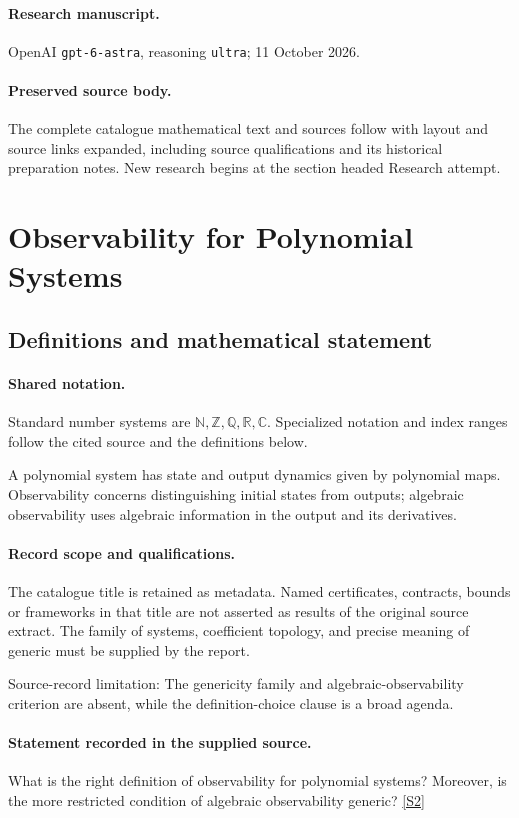 \documentclass[11pt]{article}
\begin{document}
\paragraph{Research manuscript.} OpenAI \texttt{gpt-6-astra}, reasoning \texttt{ultra}; 11 October 2026.
\paragraph{Preserved source body.} The complete catalogue mathematical text and sources follow with layout and source links expanded, including source qualifications and its historical preparation notes. New research begins at the section headed Research attempt.

\section{Observability for Polynomial Systems}\label{statement}

\subsection{Definitions and mathematical statement}

\paragraph{Shared notation.}Standard number systems are $\mathbb N,\mathbb Z,\mathbb Q,\mathbb R,\mathbb C$. Specialized notation and index ranges follow the cited source and the definitions below.


A polynomial system has state and output dynamics given by polynomial maps. Observability concerns distinguishing initial states from outputs; algebraic observability uses algebraic information in the output and its derivatives.
\paragraph{Record scope and qualifications.}
The catalogue title is retained as metadata. Named certificates, contracts, bounds or frameworks in that title are not asserted as results of the original source extract.
The family of systems, coefficient topology, and precise meaning of generic must be supplied by the report.

Source-record limitation: The genericity family and algebraic-observability criterion are absent, while the definition-choice clause is a broad agenda.
\paragraph{Statement recorded in the supplied source.}
What is the right definition of observability for polynomial systems? Moreover, is the more restricted condition of algebraic observability generic? \href{https://doi.org/10.4171/owr/2005/11}{[S2]}
\end{document}
